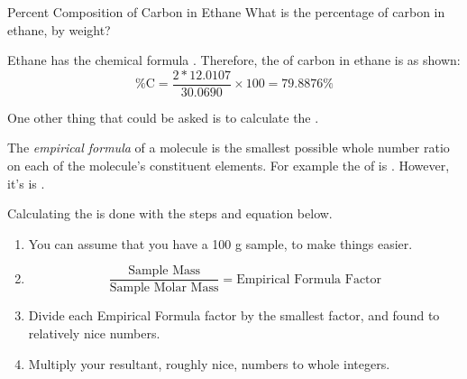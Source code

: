 \begin{example}[]{Percent Composition of Carbon in Ethane}
  What is the percentage of carbon in ethane, by weight?

  \tcblower
  
  Ethane has the chemical formula .
  Therefore, the  of carbon in ethane is as shown:
  \begin{equation*}
    \text{\% C} = \frac{2 * 12.0107}{30.0690} \times 100 = 79.8876 \%
  \end{equation*}
\end{example}

One other thing that could be asked is to calculate the .
\begin{definition} \label{def:Empirical Formula}
  The \emph{empirical formula} of a molecule is the smallest possible whole number ratio on each of the molecule's constituent elements.
  For example the  of  is .
  However, it's  is .

  Calculating the  is done with the steps and equation below.
  \begin{enumerate}
    \item You can assume that you have a 100 \si{\gram} sample, to make things easier.
    \item \begin{equation} \label{eq:Empirical Formula}
        \frac{\text{Sample Mass}}{\text{Sample Molar Mass}} = \text{Empirical Formula Factor}
      \end{equation}
    \item Divide each Empirical Formula factor by the smallest factor, and found to relatively nice numbers.
    \item Multiply your resultant, roughly nice, numbers to whole integers.
  \end{enumerate} 
\end{definition}

